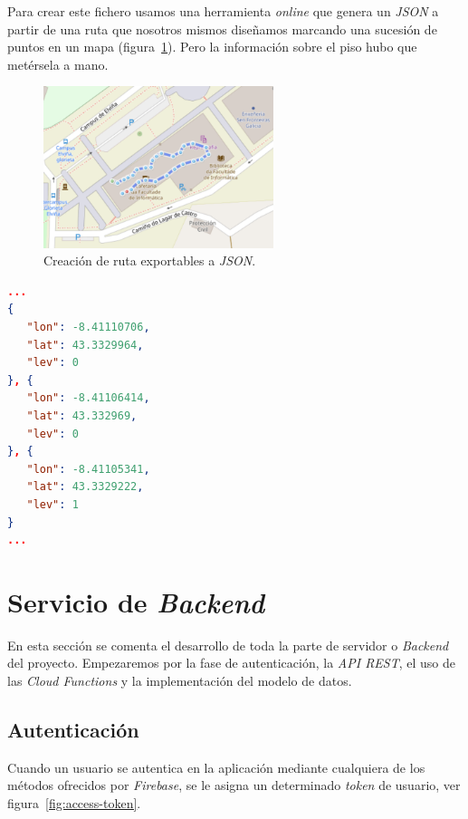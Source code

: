 Para crear este fichero usamos una herramienta \textit{online} \cite{noauthor_herramienta_nodate} que genera un \textit{JSON} a partir de una ruta que nosotros mismos diseñamos marcando una sucesión de puntos en un mapa (figura~\ref{fig:sim-json-gen}). Pero la información sobre el piso hubo que metérsela a mano.

\begin{figure}[bt]
\centering
\includegraphics[width=0.6\textwidth]{figures/sim-json-gen.png}
\caption{Creación de ruta exportables a \textit{JSON}.\label{fig:sim-json-gen}}
\end{figure}

\begin{lstlisting}[language=json,style=interfaces,caption={Fragmento de simulación \textit{JSON}, coincide con el cambio del piso 0 al 1.},label={list:json-simul}]
...
{
   "lon": -8.41110706,
   "lat": 43.3329964,
   "lev": 0
}, {
   "lon": -8.41106414,
   "lat": 43.332969,
   "lev": 0
}, {
   "lon": -8.41105341,
   "lat": 43.3329222,
   "lev": 1
}
...
\end{lstlisting}


\section{Servicio de \textit{Backend}}
En esta sección se comenta  el desarrollo de toda la parte de servidor o \textit{Backend} del proyecto. Empezaremos por la fase de autenticación, la \textit{API REST}, el uso de las \textit{Cloud Functions} y la implementación del modelo de datos.

\subsection{Autenticación}
Cuando un usuario se autentica en la aplicación mediante cualquiera de los métodos ofrecidos por \textit{Firebase}, se le asigna un determinado \textit{token} de usuario, ver figura~\ref{fig:access-token}.

